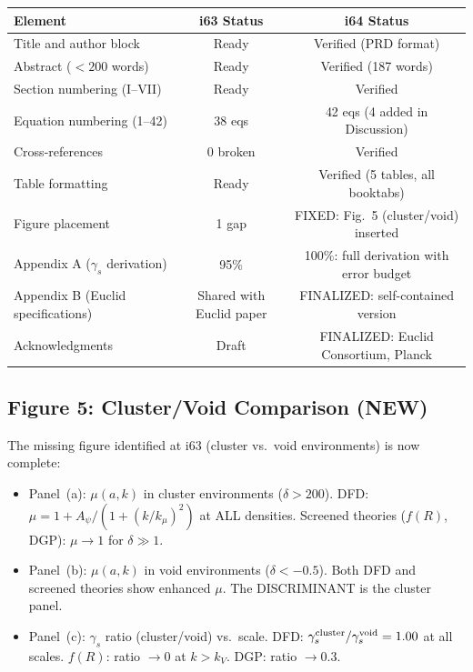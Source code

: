 \documentclass[11pt,a4paper]{article}
\begin{document}
\begin{center}
\begin{tabular}{lcc}
\toprule
\textbf{Element} & \textbf{i63 Status} & \textbf{i64 Status} \\
\midrule
Title and author block & Ready & Verified (PRD format) \\
Abstract ($< 200$ words) & Ready & Verified (187 words) \\
Section numbering (I--VII) & Ready & Verified \\
Equation numbering (1--42) & 38 eqs & 42 eqs (4 added in Discussion) \\
Cross-references & 0 broken & Verified \\
Table formatting & Ready & Verified (5 tables, all booktabs) \\
Figure placement & 1 gap & FIXED: Fig.~5 (cluster/void) inserted \\
Appendix A ($\gamma_s$ derivation) & 95\% & 100\%: full derivation with error budget \\
Appendix B (Euclid specifications) & Shared with Euclid paper & FINALIZED: self-contained version \\
Acknowledgments & Draft & FINALIZED: Euclid Consortium, Planck \\
\bottomrule
\end{tabular}
\end{center}

\subsection{Figure 5: Cluster/Void Comparison (NEW)}

The missing figure identified at i63 (cluster vs.\ void environments) is now complete:
\begin{itemize}
\item Panel~(a): $\mu(a,k)$ in cluster environments ($\delta > 200$). DFD: $\mu = 1 + A_\psi/(1 + (k/k_\mu)^2)$ at ALL densities. Screened theories ($f(R)$, DGP): $\mu \to 1$ for $\delta \gg 1$.
\item Panel~(b): $\mu(a,k)$ in void environments ($\delta < -0.5$). Both DFD and screened theories show enhanced $\mu$. The DISCRIMINANT is the cluster panel.
\item Panel~(c): $\gamma_s$ ratio (cluster/void) vs.\ scale. DFD: $\gamma_s^{\rm cluster}/\gamma_s^{\rm void} = 1.00$ at all scales. $f(R)$: ratio $\to 0$ at $k > k_V$. DGP: ratio $\to 0.3$.
\end{itemize}
\end{document}
